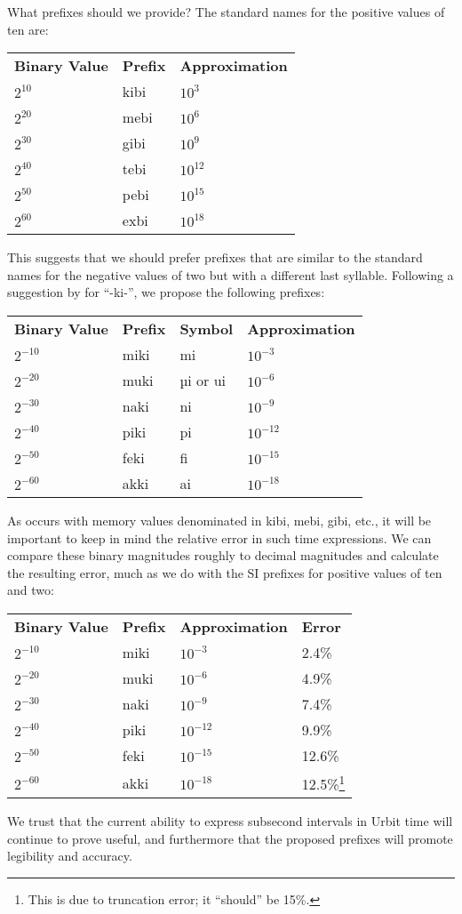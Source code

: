 \documentclass[twoside]{article}
\begin{document}
\noindent
What prefixes should we provide?  The standard names for the positive values of ten are:

\begin{tabularx}{\textwidth}{lll}
  \textbf{Binary Value} & \textbf{Prefix} & \textbf{Approximation} \\
  $2^{10}$ & kibi & $10^{3}$ \\
  $2^{20}$ & mebi & $10^{6}$ \\
  $2^{30}$ & gibi & $10^{9}$ \\
  $2^{40}$ & tebi & $10^{12}$ \\
  $2^{50}$ & pebi & $10^{15}$ \\
  $2^{60}$ & exbi & $10^{18}$ \\
\end{tabularx}

This suggests that we should prefer prefixes that are similar to the standard names for the negative values of two but with a different last syllable.  Following a suggestion by  for “-ki-”, we propose the following prefixes:

\begin{tabularx}{\textwidth}{llll}
  \textbf{Binary Value} & \textbf{Prefix} & \textbf{Symbol} & \textbf{Approximation} \\
  $2^{-10}$ & miki & mi & $10^{-3}$ \\
  $2^{-20}$ & muki & µi or ui & $10^{-6}$ \\
  $2^{-30}$ & naki & ni & $10^{-9}$ \\
  $2^{-40}$ & piki & pi & $10^{-12}$ \\
  $2^{-50}$ & feki & fi & $10^{-15}$ \\
  $2^{-60}$ & akki & ai & $10^{-18}$ \\
\end{tabularx}

As occurs with memory values denominated in kibi, mebi, gibi, etc., it will be important to keep in mind the relative error in such time expressions.  We can compare these binary magnitudes roughly to decimal magnitudes and calculate the resulting error, much as we do with the SI prefixes for positive values of ten and two:

\begin{tabularx}{\textwidth}{llll}
  \textbf{Binary Value} & \textbf{Prefix} & \textbf{Approximation} & \textbf{Error} \\
  $2^{-10}$ & miki & $10^{-3}$ & 2.4\% \\
  $2^{-20}$ & muki & $10^{-6}$ & 4.9\% \\
  $2^{-30}$ & naki & $10^{-9}$ & 7.4\% \\
  $2^{-40}$ & piki & $10^{-12}$ & 9.9\% \\
  $2^{-50}$ & feki & $10^{-15}$ & 12.6\% \\
  $2^{-60}$ & akki & $10^{-18}$ & 12.5\%\footnote{This is due to truncation error; it ``should'' be 15\%.} \\
\end{tabularx}

We trust that the current ability to express subsecond intervals in Urbit time will continue to prove useful, and furthermore that the proposed prefixes will promote legibility and accuracy. \tombstone{}

\printbibliography
\end{document}

